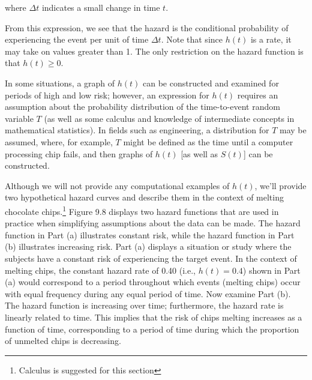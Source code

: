 \documentclass[
]{report}
\begin{document}
where \(\Delta t\) indicates a small change in time \(t\).

From this expression, we see that the hazard is the conditional probability of experiencing the event per unit of time \(\Delta t\). Note that since \(h(t)\) is a rate, it may take on values greater than 1. The only restriction on the hazard function is that \(h(t) \ge 0\).

In some situations, a graph of \(h(t)\) can be constructed and examined for periods of high and low risk; however, an expression for \(h(t)\) requires an assumption about the probability distribution of the time-to-event random variable \(T\) (as well as some calculus and knowledge of intermediate concepts in mathematical statistics). In fields such as engineering, a distribution for \(T\) may be assumed, where, for example, \(T\) might be defined as the time until a computer processing chip fails, and then graphs of \(h(t)\) {[}as well as \(S(t)\){]} can be constructed.

Although we will not provide any computational examples of \(h(t)\), we'll provide two hypothetical hazard curves and describe them in the context of melting chocolate chips.\footnote{Calculus is suggested for this section} Figure 9.8 displays two hazard functions that are used in practice when simplifying assumptions about the data can be made. The hazard function in Part (a) illustrates constant risk, while the hazard function in Part (b) illustrates increasing risk. Part (a) displays a situation or study where the subjects have a constant risk of experiencing the target event. In the context of melting chips, the constant hazard rate of 0.40 (i.e., \(h(t)=0.4\)) shown in Part (a) would correspond to a period throughout which events (melting chips) occur with equal frequency during any equal period of time. Now examine Part (b). The hazard function is increasing over time; furthermore, the hazard rate is linearly related to time. This implies that the risk of chips melting increases as a function of time, corresponding to a period of time during which the proportion of unmelted chips is decreasing.
\end{document}
